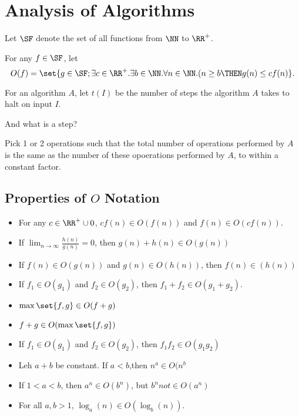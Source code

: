 \documentclass[11pt]{scrartcl}
\begin{document}
\section{Analysis of Algorithms}

Let $\SF$ denote the set of all functions from $\NN$ to $\RR^{+}$.

For any $f\in\SF$, let
\[O(f) = \set{g\in\SF; \exists c \in\RR^+.\exists b\in\NN.\forall
    n\in\NN.(n \geq b \THEN g(n) \leq c f(n)}.\]

For an algorithm $A$, let $t(I)$ be the number of steps the algorithm
$A$ takes to halt on input $I$.

And what is a step?

Pick 1 or 2 operations such that the total number of operations
performed by $A$ is the same as the number of these opoerations
performed by $A$, to within a constant factor.

\subsection{Properties of $O$ Notation}

\begin{itemize}
\item For any $c\in\RR^+\cup{0}$, $c f(n) \in O(f(n))$ and
  $f(n) \in O(c f(n))$.
\item If $\lim_{n\to \infty} \frac{h(n)}{g(n)} = 0$, then
  $g(n) + h(n) \in O(g(n))$
\item If $f(n)\in O(g(n))$ and $g(n) \in O(h(n))$, then $f(n)\in (h(n))$
\item If $f_1\in O(g_1)$ and $f_2\in O(g_2)$, then $f_1+f_2 \in O(g_1+g_2)$.
\item $\max \set{f, g} \in O(f+g)$
\item $f+g \in O(\max\set{f, g})$
\item If $f_1\in O(g_1)$ and $f_2\in O(g_2)$, then $f_1f_2\in O(g_1g_2)$
\item Leh $a+b$ be constant. If $a< b$,then $n^a\in O(n^{b}$
\item If $1 < a < b$, then $a^n\in O(b^n)$, but $b^n not\in O(a^n)$
\item For all $a, b > 1$, $\log_a(n)\in O(\log_b(n))$.
\end{itemize}
\end{document}
